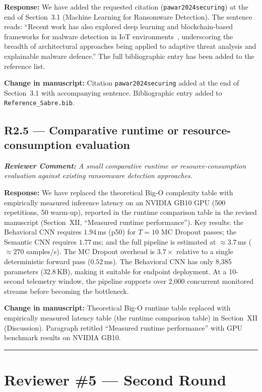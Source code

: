 \documentclass[11pt,a4paper]{article}
\newcommand{\RC}[1]{\begin{reviewbox}\textit{\textbf{Reviewer Comment:} #1}\end{reviewbox}}
\newcommand{\RS}[1]{\noindent\textcolor{responsegreen}{\textbf{Response:}} #1\par\medskip}
\newcommand{\CH}[1]{\noindent\textcolor{changebrown}{\textbf{Change in manuscript:}} #1\par\bigskip}
\begin{document}
\RS{We have added the requested citation (\texttt{pawar2024securing}) at the end of
Section~3.1 (Machine Learning for Ransomware Detection). The sentence reads: ``Recent
work has also explored deep learning and blockchain-based frameworks for malware
detection in IoT environments~\cite{pawar2024securing}, underscoring the breadth of
architectural approaches being applied to adaptive threat analysis and explainable
malware defence.'' The full bibliographic entry has been added to the reference list.}

\CH{Citation \texttt{pawar2024securing} added at the end of Section~3.1 with
accompanying sentence. Bibliographic entry added to \texttt{Reference\_Sabre.bib}.}

\subsection*{R2.5 --- Comparative runtime or resource-consumption evaluation}

\RC{A small comparative runtime or resource-consumption evaluation against existing
ransomware detection approaches.}

\RS{We have replaced the theoretical Big-O complexity table with empirically measured
inference latency on an NVIDIA GB10 GPU (500 repetitions, 50 warm-up), reported in
the runtime comparison table in the revised manuscript (Section~XII,
``Measured runtime performance''). Key results: the Behavioral CNN requires
$1.94$\,ms (p50) for $T=10$ MC Dropout passes; the Semantic CNN requires $1.77$\,ms;
and the full pipeline is estimated at $\approx 3.7$\,ms ($\approx 270$ samples/s).
The MC Dropout overhead is $3.7\times$ relative to a single deterministic forward
pass ($0.52$\,ms). The Behavioral CNN has only 8,385 parameters (32.8\,KB), making
it suitable for endpoint deployment. At a 10-second telemetry window, the pipeline
supports over 2,000 concurrent monitored streams before becoming the bottleneck.}

\CH{Theoretical Big-O runtime table replaced with empirically measured latency table
(the runtime comparison table) in Section~XII (Discussion). Paragraph
retitled ``Measured runtime performance'' with GPU benchmark results on NVIDIA GB10.}

\bigskip
\hrule
\bigskip

\section{Reviewer \#5 --- Second Round}
\end{document}
